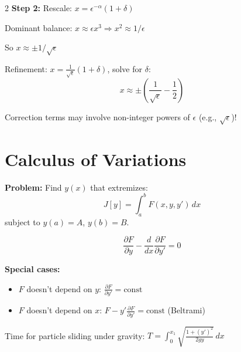 \documentclass[10pt,a4paper]{article}
\begin{document}
\begin{multicols}{2}
\textbf{Step 2:} Rescale: $x = \epsilon^{-\alpha}(1 + \delta)$

\begin{example}[$x - 1 = \epsilon x^3$, large roots]
Dominant balance: $x \approx \epsilon x^3 \Rightarrow x^2 \approx 1/\epsilon$

So $x \approx \pm 1/\sqrt{\epsilon}$

Refinement: $x = \frac{1}{\sqrt{\epsilon}}(1+\delta)$, solve for $\delta$:
\begin{equation}
x \approx \pm\left(\frac{1}{\sqrt{\epsilon}} - \frac{1}{2}\right)
\end{equation}
\end{example}

\begin{warning}
Correction terms may involve non-integer powers of $\epsilon$ (e.g., $\sqrt{\epsilon}$)!
\end{warning}

\section{Calculus of Variations}

\textbf{Problem:} Find $y(x)$ that extremizes:
\begin{equation}
J[y] = \int_a^b F(x,y,y')\,dx
\end{equation}
subject to $y(a) = A$, $y(b) = B$.

\begin{keyformula}
\begin{equation}
\frac{\partial F}{\partial y} - \frac{d}{dx}\frac{\partial F}{\partial y'} = 0
\end{equation}
\end{keyformula}

\textbf{Special cases:}
\begin{itemize}
    \item $F$ doesn't depend on $y$: $\frac{\partial F}{\partial y'} = \text{const}$
    \item $F$ doesn't depend on $x$: $F - y'\frac{\partial F}{\partial y'} = \text{const}$ (Beltrami)
\end{itemize}

\begin{example}[Brachistochrone]
Time for particle sliding under gravity:
$\displaystyle T = \int_0^{x_1}\sqrt{\frac{1+(y')^2}{2gy}}\,dx$


\end{example}
\end{multicols}
\end{document}

